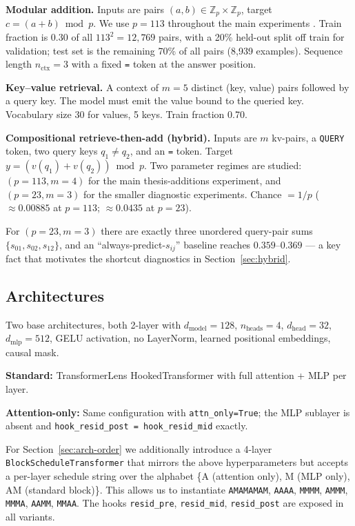 \documentclass{article}
\begin{document}
\textbf{Modular addition.} Inputs are pairs $(a,b)\in\mathbb{Z}_p\times\mathbb{Z}_p$, target $c=(a+b)\bmod p$. We use $p=113$ throughout the main experiments \citep{nanda2023progress}. Train fraction is 0.30 of all $113^2=12{,}769$ pairs, with a 20\% held-out split off train for validation; test set is the remaining 70\% of all pairs (8,939 examples). Sequence length $n_{\text{ctx}}=3$ with a fixed \texttt{=} token at the answer position.

\textbf{Key--value retrieval.} A context of $m=5$ distinct (key, value) pairs followed by a query key. The model must emit the value bound to the queried key. Vocabulary size 30 for values, 5 keys. Train fraction 0.70.

\textbf{Compositional retrieve-then-add (hybrid).} Inputs are $m$ kv-pairs, a \texttt{QUERY} token, two query keys $q_1\neq q_2$, and an \texttt{=} token. Target $y=(v(q_1)+v(q_2))\bmod p$. Two parameter regimes are studied: $(p=113, m=4)$ for the main thesis-additions experiment, and $(p=23, m=3)$ for the smaller diagnostic experiments. Chance $=1/p$ ($\approx 0.00885$ at $p=113$; $\approx 0.0435$ at $p=23$).

For $(p=23, m=3)$ there are exactly three unordered query-pair sums $\{s_{01}, s_{02}, s_{12}\}$, and an ``always-predict-$s_{ij}$'' baseline reaches $0.359$--$0.369$ --- a key fact that motivates the shortcut diagnostics in Section~\ref{sec:hybrid}.

\subsection{Architectures}

Two base architectures, both 2-layer with $d_{\text{model}}=128$, $n_{\text{heads}}=4$, $d_{\text{head}}=32$, $d_{\text{mlp}}=512$, GELU activation, no LayerNorm, learned positional embeddings, causal mask.

\textbf{Standard:} TransformerLens HookedTransformer with full attention + MLP per layer.

\textbf{Attention-only:} Same configuration with \texttt{attn\_only=True}; the MLP sublayer is absent and \texttt{hook\_resid\_post = hook\_resid\_mid} exactly.

For Section~\ref{sec:arch-order} we additionally introduce a 4-layer \texttt{BlockScheduleTransformer} that mirrors the above hyperparameters but accepts a per-layer schedule string over the alphabet \{A (attention only), M (MLP only), AM (standard block)\}. This allows us to instantiate \texttt{AMAMAMAM}, \texttt{AAAA}, \texttt{MMMM}, \texttt{AMMM}, \texttt{MMMA}, \texttt{AAMM}, \texttt{MMAA}. The hooks \texttt{resid\_pre}, \texttt{resid\_mid}, \texttt{resid\_post} are exposed in all variants.
\end{document}
